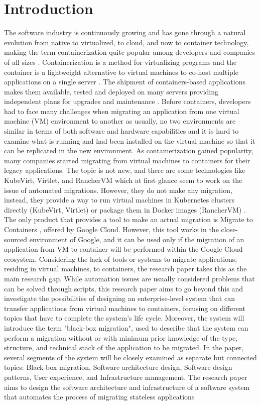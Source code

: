 \documentclass[twocolumn]{article}
\begin{document}
\section{Introduction}
The software industry is continuously growing and has gone through a natural evolution from native to virtualized, to cloud, and now to container technology, making the term containerization quite popular among developers and companies of all sizes \cite{SiddiquiEtAl-2020}. Containerization is a method for virtualizing programs \cite{VermaEtAl-2022} and the container is a lightweight alternative to virtual machines to co-host multiple applications on a single server \cite{GargEtAl-2024}. The shipment of containers-based applications makes them available, tested and deployed on many servers \cite{VermaEtAl-2022} providing independent plans for upgrades and maintenance \cite{SiddiquiEtAl-2020}. Before containers, developers had to face many challenges when migrating an application from one virtual machine (VM) environment to another as usually, no two environments are similar in terms of both software and hardware capabilities \cite{SiddiquiEtAl-2020} and it is hard to examine what is running and had been installed on the virtual machine so that it can be replicated in the new environment. As containerization gained popularity, many companies started migrating from virtual machines to containers for their legacy applications. The topic is not new, and there are some technologies like KubeVirt, Virtlet, and RancherVM which at first glance seem to work on the issue of automated migrations. However, they do not make any migration, instead, they provide a way to run virtual machines in Kubernetes clusters directly (KubeVirt, Virtlet)\cite{Sheldon-2022} or package them in Docker images (RancherVM) \cite{Baccini-2021}. The only product that provides a tool to make an actual migration is Migrate to Containers \cite{Google-2024}, offered by Google Cloud. However, this tool works in the close-sourced environment of Google, and it can be used only if the migration of an application from VM to container will be performed within the Google Cloud ecosystem. Considering the lack of tools or systems to migrate applications, residing in virtual machines, to containers, the research paper takes this as the main research gap. While automation issues are usually considered problems that can be solved through scripts, this research paper aims to go beyond this and investigate the possibilities of designing an enterprise-level system that can transfer applications from virtual machines to containers, focusing on different topics that have to complete the system's life cycle. Moreover, the system will introduce the term "black-box migration", used to describe that the system can perform a migration without or with minimum prior knowledge of the type, structure, and technical stack of the application to be migrated. In the paper, several segments of the system will be closely examined as separate but connected topics: Black-box migration, Software architecture design, Software design patterns, User experience, and Infrastructure management. The research paper aims to design the software architecture and infrastructure of a software system that automates the process of migrating stateless applications 
\end{document}
